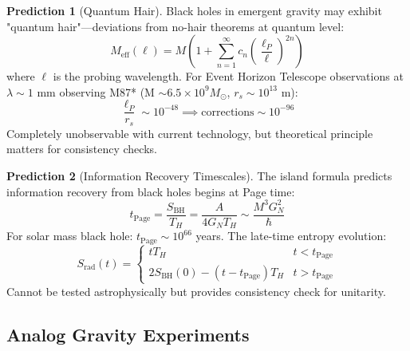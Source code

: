 \documentclass[11pt,a4paper]{article}
\theoremstyle{remark}
\theoremstyle{definition}
\newtheorem{prediction}{Prediction}[section]
\begin{document}
\begin{prediction}[Quantum Hair]
Black holes in emergent gravity may exhibit "quantum hair"—deviations from no-hair theorems at quantum level:
\begin{equation}
M_{\text{eff}}(\ell) = M\left(1 + \sum_{n=1}^\infty c_n \left(\frac{\ell_P}{\ell}\right)^{2n}\right)
\end{equation}
where $\ell$ is the probing wavelength. For Event Horizon Telescope observations at $\lambda \sim 1$ mm observing M87* (M $\sim 6.5 \times 10^9 M_\odot$, $r_s \sim 10^{13}$ m):
\begin{equation}
\frac{\ell_P}{r_s} \sim 10^{-48} \implies \text{corrections} \sim 10^{-96}
\end{equation}
Completely unobservable with current technology, but theoretical principle matters for consistency checks.
\end{prediction}

\begin{prediction}[Information Recovery Timescales]
The island formula predicts information recovery from black holes begins at Page time:
\begin{equation}
t_{\text{Page}} = \frac{S_{\text{BH}}}{T_H} = \frac{A}{4G_N T_H} \sim \frac{M^3 G_N^2}{\hbar}
\end{equation}
For solar mass black hole: $t_{\text{Page}} \sim 10^{66}$ years. The late-time entropy evolution:
\begin{equation}
S_{\text{rad}}(t) = \begin{cases}
t T_H & t < t_{\text{Page}} \\
2S_{\text{BH}}(0) - (t-t_{\text{Page}})T_H & t > t_{\text{Page}}
\end{cases}
\end{equation}
Cannot be tested astrophysically but provides consistency check for unitarity.
\end{prediction}

\subsection{Analog Gravity Experiments}
\end{document}

